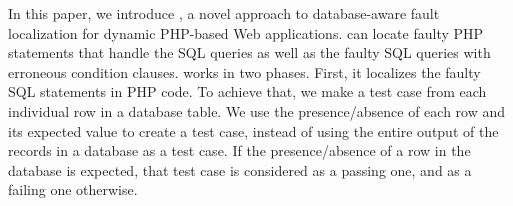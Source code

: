 


In this paper, we introduce {\tool}, a novel approach to
database-aware fault localization for dynamic PHP-based Web
applications. {\tool} can locate faulty PHP statements that handle
the SQL queries as well as the faulty SQL queries with erroneous
condition clauses.
%
{\tool} works in two phases. First, it localizes the faulty SQL
statements in PHP code. To achieve that, we make a test case from each
individual row in a database table. We use the presence/absence of
each row and its expected value to create a test case, instead of
using the entire output of the records in a database as a test case.
If the presence/absence of a row in the database is expected,
that test case is considered as a passing one, and as a failing one
otherwise.

